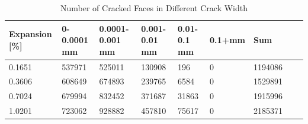 
\begin{table}[ht!]
  \caption{Number of Cracked Faces in Different Crack Width}
    \centering
    \begin{tabular}{| p{2.0cm} | p{1.6cm} | p{1.6cm} | p{1.6cm} | p{1.6cm} | p{1.6cm} | p{1.6cm} | p{1.6cm} | p{2.0cm} | }
    \hline

	Expansion [\%] & 0-0.0001 mm & 0.0001-0.001 mm & 0.001-0.01 mm & 0.01-0.1 mm & 0.1+mm & Sum \\ \hline

    0.1651 &	537971 &	525011 &	130908 &	196 &	0 &	1194086\\ \hline
    0.3606 &	608649 &	674893 &	239765 &	6584 &	0 &	1529891\\ \hline
    0.7024 &	679994 &	832452 &	371687 &	31863 &	0 &	1915996\\ \hline
    1.0201 &	723062 &	928882 &	457810 &	75617 &	0 &	2185371\\ \hline


    \end{tabular}

    \label{}
\end{table}



